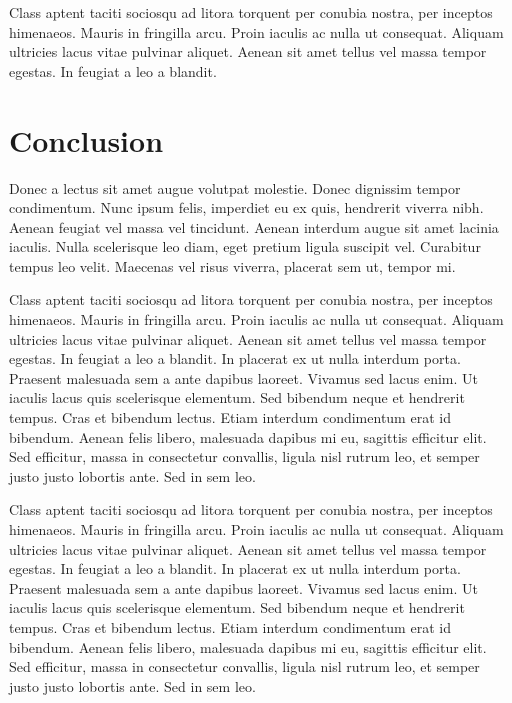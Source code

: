 \documentclass{article}
\begin{document}
\vspace{5mm}
Class aptent taciti sociosqu ad litora torquent per conubia nostra, per inceptos himenaeos. Mauris in fringilla arcu. Proin iaculis ac nulla ut consequat. Aliquam ultricies lacus vitae pulvinar aliquet. Aenean sit amet tellus vel massa tempor egestas. In feugiat a leo a blandit. 

\newpage

\section{Conclusion}
Donec a lectus sit amet augue volutpat molestie. Donec dignissim tempor condimentum. Nunc ipsum felis, imperdiet
eu ex quis, hendrerit viverra nibh. Aenean feugiat vel massa vel tincidunt. Aenean interdum augue sit amet lacinia
iaculis. Nulla scelerisque leo diam, eget pretium ligula suscipit vel. Curabitur tempus leo velit. Maecenas vel
risus viverra, placerat sem ut, tempor mi.

\vspace{5mm}
Class aptent taciti sociosqu ad litora torquent per conubia nostra, per inceptos himenaeos. Mauris in fringilla arcu. Proin iaculis ac nulla ut consequat. Aliquam ultricies lacus vitae pulvinar aliquet. Aenean sit amet tellus vel massa tempor egestas. In feugiat a leo a blandit. In placerat ex ut nulla interdum porta. Praesent malesuada sem a ante dapibus laoreet. Vivamus sed lacus enim. Ut iaculis lacus quis scelerisque elementum. Sed bibendum neque et hendrerit tempus. Cras et bibendum lectus. Etiam interdum condimentum erat id bibendum. Aenean felis libero, malesuada dapibus mi eu, sagittis efficitur elit. Sed efficitur, massa in consectetur convallis, ligula nisl rutrum leo, et semper justo justo lobortis ante. Sed in sem leo.

\vspace{5mm}
Class aptent taciti sociosqu ad litora torquent per conubia nostra, per inceptos himenaeos. Mauris in fringilla arcu. Proin iaculis ac nulla ut consequat. Aliquam ultricies lacus vitae pulvinar aliquet. Aenean sit amet tellus vel massa tempor egestas. In feugiat a leo a blandit. In placerat ex ut nulla interdum porta. Praesent malesuada sem a ante dapibus laoreet. Vivamus sed lacus enim. Ut iaculis lacus quis scelerisque elementum. Sed bibendum neque et hendrerit tempus. Cras et bibendum lectus. Etiam interdum condimentum erat id bibendum. Aenean felis libero, malesuada dapibus mi eu, sagittis efficitur elit. Sed efficitur, massa in consectetur convallis, ligula nisl rutrum leo, et semper justo justo lobortis ante. Sed in sem leo.
\end{document}
